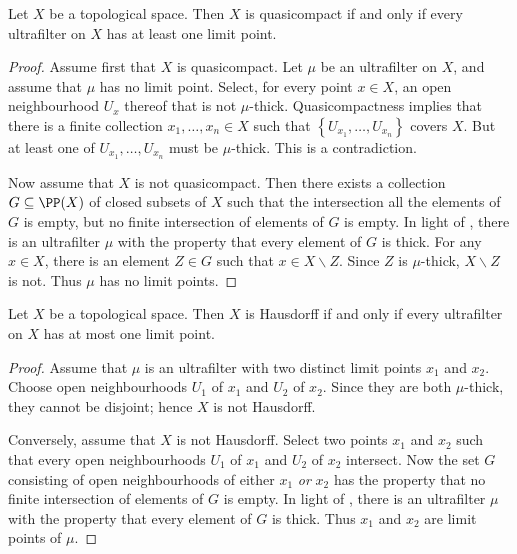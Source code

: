 \begin{lemma} \label{quasicompactiffeveryultrafilterhasalimitpoint}
	Let $ X $ be a topological space.
	Then $ X $ is quasicompact if and only if every ultrafilter on $ X $ has at least one limit point.
\end{lemma}

\begin{proof}
	Assume first that $ X $ is quasicompact.
	Let $ \mu $ be an ultrafilter on $ X $, and assume that $ \mu $ has no limit point.
	Select, for every point $ x \in X $, an open neighbourhood $ U_x $ thereof that is not $ \mu $-thick.
	Quasicompactness implies that there is a finite collection $ x_1, \dots, x_n \in X $ such that $ \left\{ U_{x_1}, \dots, U_{x_n} \right\} $ covers $ X $.
	But at least one of $ U_{x_1}, \dots, U_{x_n} $ must be $ \mu $-thick.
	This is a contradiction.

	Now assume that $ X $ is not quasicompact.
	Then there exists a collection $ G \subseteq \PP(X) $ of closed subsets of $ X $ such that the intersection all the elements of $ G $ is empty, but no finite intersection of elements of $ G $ is empty.
	In light of , there is an ultrafilter $ \mu $ with the property that every element of $ G $ is thick.
	For any $ x \in X $, there is an element $ Z \in G $ such that $ x \in X \smallsetminus Z $.
	Since $ Z $ is $ \mu $-thick, $ X \smallsetminus Z $ is not.
	Thus $ \mu $ has no limit points.
\end{proof}

\begin{lemma} \label{hausdorffiffeveryultrafilterhasatmostonelimitpoint}
	Let $ X $ be a topological space.
	Then $ X $ is Hausdorff if and only if every ultrafilter on $ X $ has at most one limit point.
\end{lemma}

\begin{proof}
	Assume that $ \mu $ is an ultrafilter with two distinct limit points $ x_1 $ and $ x_2 $.
	Choose open neighbourhoods $ U_1 $ of $ x_1 $ and $ U_2 $ of $ x_2 $.
	Since they are both $ \mu $-thick, they cannot be disjoint;
	hence $ X $ is not Hausdorff.

	Conversely, assume that $ X $ is not Hausdorff.
	Select two points $ x_1 $ and $ x_2 $ such that every open neighbourhoods $ U_1 $ of $ x_1 $ and $ U_2 $ of $ x_2 $ intersect.
	Now the set $ G $ consisting of open neighbourhoods of either $ x_1 $ \emph{or} $ x_2 $ has the property that no finite intersection of elements of $ G $ is empty.
	In light of , there is an ultrafilter $ \mu $ with the property that every element of $ G $ is thick.
	Thus $ x_1 $ and $ x_2 $ are limit points of $ \mu $.
\end{proof}

